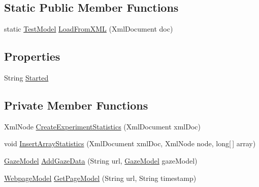 \subsection*{Static Public Member Functions}
\begin{DoxyCompactItemize}
\item 
static \hyperlink{class_web_analyzer_1_1_models_1_1_data_model_1_1_test_model}{Test\+Model} \hyperlink{class_web_analyzer_1_1_models_1_1_data_model_1_1_test_model_a0bf31831033b33d1e50ddd856c6a61aa}{Load\+From\+X\+M\+L} (Xml\+Document doc)
\end{DoxyCompactItemize}
\subsection*{Properties}
\begin{DoxyCompactItemize}
\item 
String \hyperlink{class_web_analyzer_1_1_models_1_1_data_model_1_1_test_model_acdb09845b9c3bc8582f78d2729524216}{Started}
\end{DoxyCompactItemize}
\subsection*{Private Member Functions}
\begin{DoxyCompactItemize}
\item 
Xml\+Node \hyperlink{class_web_analyzer_1_1_models_1_1_data_model_1_1_test_model_aeb5429731ec41e1460952faf568e10be}{Create\+Experiment\+Statistics} (Xml\+Document xml\+Doc)
\item 
void \hyperlink{class_web_analyzer_1_1_models_1_1_data_model_1_1_test_model_a285dda9a94c63de7c47203f47e69e372}{Insert\+Array\+Statistics} (Xml\+Document xml\+Doc, Xml\+Node node, long\mbox{[}$\,$\mbox{]} array)
\item 
\hyperlink{class_web_analyzer_1_1_models_1_1_data_model_1_1_gaze_model}{Gaze\+Model} \hyperlink{class_web_analyzer_1_1_models_1_1_data_model_1_1_test_model_adf086c022e7d9475f2e705665af0721a}{Add\+Gaze\+Data} (String url, \hyperlink{class_web_analyzer_1_1_models_1_1_data_model_1_1_gaze_model}{Gaze\+Model} gaze\+Model)
\item 
\hyperlink{class_web_analyzer_1_1_models_1_1_data_model_1_1_webpage_model}{Webpage\+Model} \hyperlink{class_web_analyzer_1_1_models_1_1_data_model_1_1_test_model_a6d6d0f87ceb7fe9a7ea38d49ae69b6f4}{Get\+Page\+Model} (String url, String timestamp)
\end{DoxyCompactItemize}
